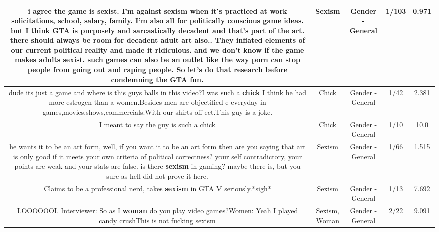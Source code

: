 \documentclass[11pt]{article}
\newlength\mylength
\begin{document}
\begin{center}
\begin{longtable}{|C{.65\mylength}|C{.30\mylength}|C{.12\mylength}|C{.12\mylength}|C{.12\mylength}|}
  \small i agree the game is sexist. I'm against \textbf{sexism} when it's practiced at work solicitations, school, salary, family. I'm also all for politically conscious game ideas. but I think GTA is purposely and sarcastically decadent and that's part of the art. there should always be room for decadent adult art also.. They inflated elements of our current political reality and made it ridiculous.  and we don't know if the game makes adults sexist. such games can also be an outlet like the way porn can stop people from going out and raping people.  So let's do that research before condemning the GTA fun.\normalsize   & Sexism & Gender - General & 1/103 & 0.971 \\  \hline
  \small dude its just a game and where is this guys balls in this video?I was such a \textbf{chick} I think he had more estrogen than a women.Besides men are objectified e everyday in games,movies,shows,commercials.With our shirts off ect.This guy is a joke.\normalsize   & Chick & Gender - General & 1/42 & 2.381 \\  \hline
  \small I meant to say the guy is such a chick\normalsize   & Chick & Gender - General & 1/10 & 10.0 \\  \hline
  \small he wants it to be an art form, well, if you want it to be an art form then are you saying that art is only good if it meets your own criteria of political correctness? your self contradictory, your points are weak and your stats are false. is there \textbf{sexism} in gaming? maybe there is, but you sure as hell did not prove it here.\normalsize   & Sexism & Gender - General & 1/66 & 1.515 \\  \hline
  \small Claims to be a professional nerd, takes \textbf{sexism} in GTA V seriously.*sigh*\normalsize   & Sexism & Gender - General & 1/13 & 7.692 \\  \hline
  \small LOOOOOOL Interviewer: So as I \textbf{woman} do you play video games?Women: Yeah I played candy crushThis is not fucking sexism\normalsize   & Sexism, Woman & Gender - General & 2/22 & 9.091 \\  \hline

\end{longtable}
\end{center}
\end{document}
